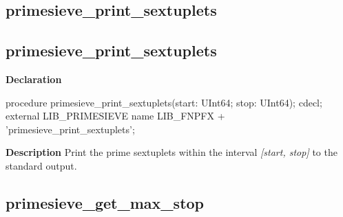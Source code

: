 \documentclass{report}
\newif\ifpdf
\begin{document}
\subsection*{\large{\textbf{primesieve{\_}print{\_}sextuplets}}\normalsize\hspace{1ex}\hrulefill}
\else
\subsection*{primesieve{\_}print{\_}sextuplets}
\fi
\label{primesieve-primesieve_print_sextuplets}
\begin{list}{}{
\setlength{\itemindent}{0cm}
\setlength{\listparindent}{0cm}
\setlength{\leftmargin}{\evensidemargin}
\addtolength{\leftmargin}{\tmplength}
\settowidth{\labelsep}{X}
\addtolength{\leftmargin}{\labelsep}
\setlength{\labelwidth}{\tmplength}
}
\item[\textbf{Declaration}\hfill]
\ifpdf
\begin{flushleft}
\fi
\begin{ttfamily}
procedure primesieve{\_}print{\_}sextuplets(start: UInt64; stop: UInt64); cdecl; external LIB{\_}PRIMESIEVE name LIB{\_}FNPFX + 'primesieve{\_}print{\_}sextuplets';\end{ttfamily}

\ifpdf
\end{flushleft}
\fi

\par
\item[\textbf{Description}]
Print the prime sextuplets within the interval \textit{[start, stop]} to the standard output.

\end{list}
\ifpdf
\subsection*{\large{\textbf{primesieve{\_}get{\_}max{\_}stop}}\normalsize\hspace{1ex}\hrulefill}
\else
\end{document}

